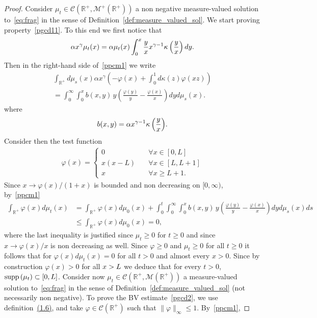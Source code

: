 \documentclass[10pt,a4paper]{amsart}
\numberwithin{equation}{section}
\newcommand*\dst{\displaystyle}
\newcommand*\R{\mathbb{R}}
\newcommand*\M{\mathcal{M}}
\newcommand{\clC}{\mathcal{C}}
\newcommand{\MT}[1]{{\textcolor{black}{#1}}}
\newcommand*\supp{{\mbox{\small\rm supp}}\,}
\let\oldforall\forall
\renewcommand*{\forall}{\mathrel{\oldforall}}
\begin{document}
\begin{proof}
Consider $\mu_t \in \clC(\R^+,\M^+(\R^+))$ a non negative measure-valued solution to~\eqref{eq:frag} in the sense of Definition~\eqref{def:measure_valued_sol}. We start proving property~\eqref{pgcd11}. To this end we first notice that
\begin{align*}
\alpha x^\gamma \mu _t(x)=\MT{\alpha}\mu _t(x)\int _0^x\frac {y} {x}x^{\gamma -1}\kappa \left(\frac {y} {x}\right)dy.
\end{align*}
Then in the right-hand side of~\eqref{ppcm1} we write
\begin{multline*}
\int_{\R^+} d\mu_s(x) \alpha x^{\gamma}\left(- \varphi(x) + \dst\int_{0}^{1} d\kappa(z)\varphi(xz)\right)\\
=\int _0^\infty\int _0^x b(x, y)\, y\left(\frac {\varphi (y)} {y}- \frac {\varphi (x)} {x}\right)dyd\mu _s(x).
\end{multline*}
where
\begin{align}\label{bxy}
b(x,y)=\MT{\alpha x^{\gamma-1}\kappa \left(
\frac{y}{x}\right)}.
\end{align}
Consider then the test function
\begin{align*}
\varphi (x)=
\begin{cases}
0 &\forall x\in [0, L]\\
x(x-L)\quad &\forall x\in [L, L+1]\\
x &\forall x\ge L+1.
\end{cases}
\end{align*}
Since $x\to \varphi (x)/(1+x)$ is bounded and non decreasing on $[0, \infty)$, by~\eqref{ppcm1}
\begin{align*}
\int_{\R^+} \varphi(x) d\mu_t(x)&= \int_{\R^+}
\varphi(x) d\mu_0(x) + \int_0^t \int _0^\infty\int _0^x b(x, y)\, y\left(\frac {\varphi (y)} {y}- \frac {\varphi (x)} {x}\right)dyd\mu _s(x) ds\\
& \le \int_{\R^+} \varphi(x) d\mu_0(x) =0,
\end{align*}
where the last inequality is justified since $\mu_t\geq 0$ for $t\geq 0$ and since $x\to \varphi(x)/x$ is non decreasing as well. Since $\varphi\ge 0$ and $ \mu _t\ge 0$ for all $t\ge 0$ it follows that for $\varphi (x)d\mu _t(x)=0$ for all $t>0$ and almost every $x>0$. Since by construction $\varphi (x)>0$ for all $x>\MT{L}$ we deduce that for every $t>0$, $\supp (\mu _t)\subset [0, \MT{L}]$.
Consider now $\mu_t \in \clC(\R^+,\M(\R^+))$ a measure-valued solution to~\eqref{eq:frag} in the sense of Definition~\eqref{def:measure_valued_sol} (not necessarily non negative). To prove the BV estimate~\eqref{pgcd2}, we use definition~\href{https://ahl.centre-mersenne.org/item/AHL_2024__7__621_0/}{(1.6)}, and take $\varphi \in \clC(\R^+)$ such that $\|\varphi\|_{\infty} \leq 1$. By~\eqref{ppcm1},

\end{proof}
\end{document}
